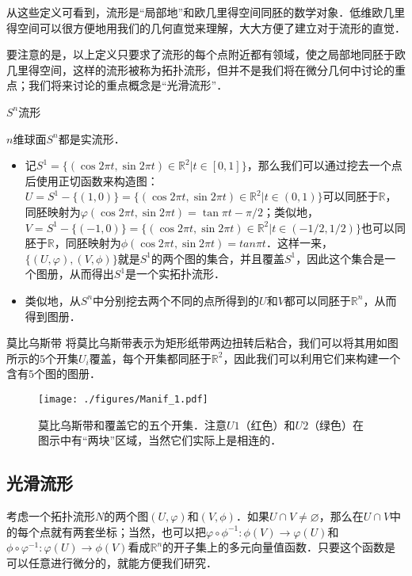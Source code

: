 从这些定义可看到，流形是“局部地”和欧几里得空间同胚的数学对象．低维欧几里得空间可以很方便地用我们的几何直觉来理解，大大方便了建立对于流形的直觉．

要注意的是，以上定义只要求了流形的每个点附近都有领域，使之局部地同胚于欧几里得空间，这样的流形被称为拓扑流形，但并不是我们将在微分几何中讨论的重点；我们将来讨论的重点概念是“光滑流形”．

\begin{example}{$S^n$流形}

$n$维球面$S^n$都是实流形．
\begin{itemize}
\item 记$S^1=\{(\cos{2\pi t},\sin{2\pi t})\in\mathbb{R}^2|t\in[0, 1]\}$，那么我们可以通过挖去一个点后使用正切函数来构造图：$U=S^1-\{(1,0)\}=\{(\cos{2\pi t},\sin{2\pi t})\in\mathbb{R}^2|t\in(0, 1)\}$可以同胚于$\mathbb{R}$，同胚映射为$\varphi(\cos{2\pi t},\sin{2\pi t})=\tan{\pi t-\pi/2}$；类似地，$V=S^1-\{(-1, 0)\}=\{(\cos{2\pi t},\sin{2\pi t})\in\mathbb{R}^2|t\in(-1/2, 1/2)\}$也可以同胚于$\mathbb{R}$，同胚映射为$\phi(\cos{2\pi t},\sin{2\pi t})=tan{\pi t}$．这样一来，$\{(U, \varphi), (V, \phi)\}$就是$S^1$的两个图的集合，并且覆盖$S^1$，因此这个集合是一个图册，从而得出$S^1$是一个实拓扑流形．
\item 类似地，从$S^n$中分别挖去两个不同的点所得到的$U$和$V$都可以同胚于$\mathbb{R}^n$，从而得到图册．


\end{itemize}

\end{example}

\begin{example}{莫比乌斯带}
将莫比乌斯带表示为矩形纸带两边扭转后粘合，我们可以将其用如图所示的$5$个开集$U_i$覆盖，每个开集都同胚于$\mathbb{R}^2$，因此我们可以利用它们来构建一个含有$5$个图的图册．
\begin{figure}[ht]
\centering
\texttt{[image: ./figures/Manif\_1.pdf]}
\caption{莫比乌斯带和覆盖它的五个开集．注意$U1$（红色）和$U2$（绿色）在图示中有“两块”区域，当然它们实际上是相连的．} \label{Manif_fig1}
\end{figure}
\end{example}

\subsection{光滑流形}

考虑一个拓扑流形$N$的两个图$(U, \varphi)$和$(V, \phi)$．如果$U\cap V\not=\varnothing$，那么在$U\cap V$中的每个点就有两套坐标；当然，也可以把$\varphi\circ\phi^{-1}:\phi(V)\rightarrow\varphi(U)$和$\phi\circ\varphi^{-1}:\varphi(U)\rightarrow\phi(V)$看成$\mathbb{R}^n$的开子集上的多元向量值函数．只要这个函数是可以任意进行微分的，就能方便我们研究．


